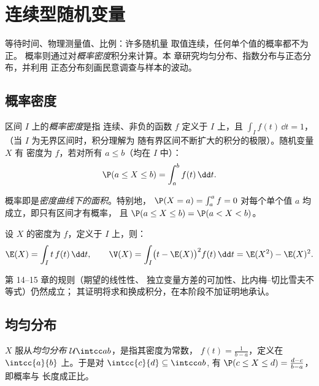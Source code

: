 \chapter{连续型随机变量}\label{ch:g12:contdist}

等待时间、物理测量值、比例：许多随机量
取值连续，任何单个值的概率都不为正。
概率则通过对\emph{概率密度}积分来计算。本
章研究均匀分布、指数分布与正态分布，并利用
正态分布刻画民意调查与样本的波动。

\section{概率密度}

\begin{definition}\label{def:g12:contdist:density}
区间 $I$ 上的\emph{概率密度}是指
连续、非负的函数 $f$ 定义于 $I$ 上，且 $\int_I f(t)\,\dd t = 1$，
（当 $I$ 为无界区间时，积分理解为
随有界区间不断扩大的积分的极限）。随机变量 $X$ 有
密度为 $f$，若对所有 $a \leq b$（均在 $I$ 中）：
\[
\P(a \leq X \leq b) = \int_a^b f(t)\,\dd t .
\]
\end{definition}

概率即是\emph{密度曲线下的面积}。特别地，
$\P(X = a) = \int_a^a f = 0$ 对每个单个值 $a$ 均成立，即只有区间才有概率，
且 $\P(a \leq X \leq b) = \P(a < X < b)$。

\begin{definition}[期望与方差]\label{def:g12:contdist:exp}
设 $X$ 的密度为 $f$，定义于 $I$ 上，则：
\[
\E(X) = \int_I t\,f(t)\,\dd t, \qquad
\V(X) = \int_I \bigl(t - \E(X)\bigr)^2 f(t)\,\dd t
= \E(X^2) - \E(X)^2 .
\]
\end{definition}

第 14--15 章的规则（期望的线性性、
独立变量方差的可加性、比内梅–切比雪夫不等式）仍然成立；
其证明将求和换成积分，在本阶段不加证明地承认。

\section{均匀分布}

\begin{definition}[均匀分布]\label{def:g12:contdist:uniform}
$X$ 服从\emph{均匀分布}
$\mathcal U\intcc ab$，是指其密度为常数，
$f(t) = \frac{1}{b-a}$，定义在 $\intcc{a}{b}$ 上。于是对
$\intcc{c}{d} \subseteq \intcc ab$,
有 $\P(c \leq X \leq d) = \frac{d - c}{b - a}$，即概率与
长度成正比。
\end{definition}

